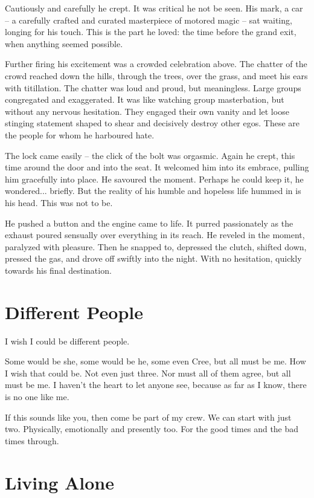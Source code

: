 \documentclass[fontsize=12pt,english]{scrreprt}
\begin{document}
Cautiously and carefully he crept. It was critical he not be seen. His
mark, a car -- a carefully crafted and curated masterpiece of motored
magic -- sat waiting, longing for his touch. This is the part he
loved: the time before the grand exit, when anything seemed
possible.

Further firing his excitement was a crowded celebration above. The
chatter of the crowd reached down the hills, through the trees, over
the grass, and meet his ears with titillation. The chatter was loud
and proud, but meaningless. Large groups congregated and
exaggerated. It was like watching group masterbation, but without any
nervous hesitation. They engaged their own vanity and let loose
stinging statement shaped to shear and decisively destroy other
egos. These are the people for whom he harboured hate.

The lock came easily -- the click of the bolt was orgasmic. Again he
crept, this time around the door and into the seat. It welcomed him
into its embrace, pulling him gracefully into place. He savoured the
moment. Perhaps he could keep it, he wondered... briefly. But the
reality of his humble and hopeless life hummed in is his head. This
was not to be.

He pushed a button and the engine came to life. It purred passionately
as the exhaust poured sensually over everything in its reach. He
reveled in the moment, paralyzed with pleasure. Then he snapped to,
depressed the clutch, shifted down, pressed the gas, and drove off
swiftly into the night. With no hesitation, quickly towards his final
destination.

\newpage

\section{Different People}

I wish I could be different people.

Some would be she, some would be he, some even Cree, but all must be
me. How I wish that could be. Not even just three. Nor must all of
them agree, but all must be me. I haven't the heart to let anyone see,
because as far as I know, there is no one like me.

If this sounds like you, then come be part of my crew. We can start
with just two. Physically, emotionally and presently too. For the good
times and the bad times through.

\newpage

\section{Living Alone}
\end{document}
